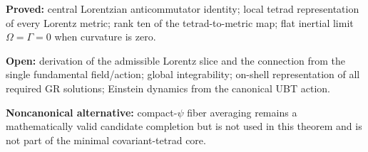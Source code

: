 \documentclass[12pt]{article}
\theoremstyle{remark}\newtheorem{remark}[definition]{Remark}
\begin{document}
\begin{tcolorbox}[colback=yellow!8!white,colframe=orange!70!black,
 title=Proof status]
\textbf{Proved:} central Lorentzian anticommutator identity; local tetrad
representation of every Lorentz metric; rank ten of the tetrad-to-metric map;
flat inertial limit $\Omega=\Gamma=0$ when curvature is zero.

\textbf{Open:} derivation of the admissible Lorentz slice and the connection
from the single fundamental field/action; global integrability; on-shell
representation of all required GR solutions; Einstein dynamics from the
canonical UBT action.

\textbf{Noncanonical alternative:} compact-$\psi$ fiber averaging remains a
mathematically valid candidate completion but is not used in this theorem and
is not part of the minimal covariant-tetrad core.
\end{tcolorbox}
\end{document}
